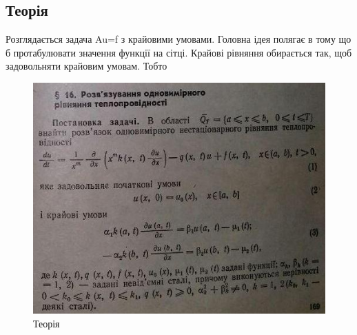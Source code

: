 \documentclass[fontsize=14pt,DIV=1,a4paper]{scrartcl}
\begin{document}
	\subsection{Теорія}
	Розглядається задача Au=f з крайовими умовами. Головна ідея полягає в тому що б протабулювати значення функції на сітці. Крайові рівняння обирається так, щоб задовольняти крайовим умовам. Тобто
	\begin{figure}[h!]
		\includegraphics[scale=1.25]{th_ii1.jpg}
		\centering
		\caption{Теорія}
	\end{figure}
	
\end{document}
